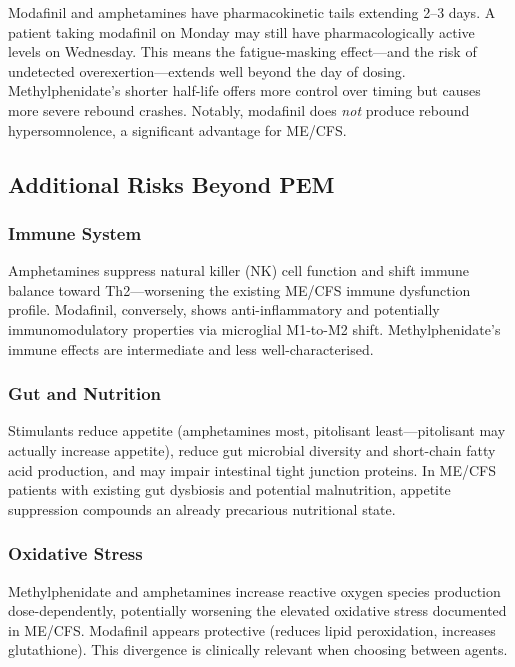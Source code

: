 Modafinil and amphetamines have pharmacokinetic tails extending 2--3 days. A patient taking modafinil on Monday may still have pharmacologically active levels on Wednesday. This means the fatigue-masking effect---and the risk of undetected overexertion---extends well beyond the day of dosing. Methylphenidate's shorter half-life offers more control over timing but causes more severe rebound crashes. Notably, modafinil does \textit{not} produce rebound hypersomnolence, a significant advantage for ME/CFS.

\subsection{Additional Risks Beyond PEM}
\label{subsec:stimulant-additional-risks}

\subsubsection{Immune System}

Amphetamines suppress natural killer (NK) cell function and shift immune balance toward Th2---worsening the existing ME/CFS immune dysfunction profile. Modafinil, conversely, shows anti-inflammatory and potentially immunomodulatory properties via microglial M1-to-M2 shift. Methylphenidate's immune effects are intermediate and less well-characterised.

\subsubsection{Gut and Nutrition}

Stimulants reduce appetite (amphetamines most, pitolisant least---pitolisant may actually increase appetite), reduce gut microbial diversity and short-chain fatty acid production, and may impair intestinal tight junction proteins. In ME/CFS patients with existing gut dysbiosis and potential malnutrition, appetite suppression compounds an already precarious nutritional state.

\subsubsection{Oxidative Stress}

Methylphenidate and amphetamines increase reactive oxygen species production dose-dependently, potentially worsening the elevated oxidative stress documented in ME/CFS. Modafinil appears protective (reduces lipid peroxidation, increases glutathione). This divergence is clinically relevant when choosing between agents.

